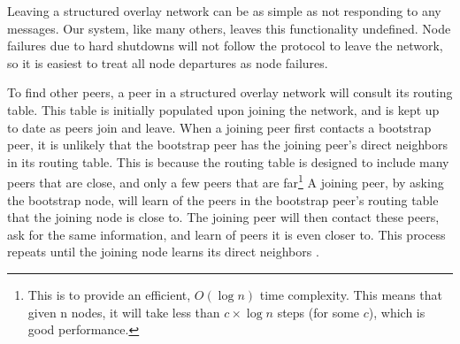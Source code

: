 \documentclass[12pt]{report}
\begin{document}

Leaving a structured overlay network can be as simple as not responding to any messages. Our system, like many others, leaves this functionality undefined. Node failures due to hard shutdowns will not follow the protocol to leave the network, so it is easiest to treat all node departures as node failures.

To find other peers, a peer in a structured overlay network will consult its routing table. This table is initially populated upon joining the network, and is kept up to date as peers join and leave. When a joining peer first contacts a bootstrap peer, it is unlikely that the bootstrap peer has the joining peer's direct neighbors in its routing table. This is because the routing table is designed to include many peers that are close, and only a few peers that are far\footnote{This is to provide an efficient, $O(\log n)$ time complexity. This means that given n nodes, it will take less than $c \times \log n$ steps (for some $c$), which is good performance.} A joining peer, by asking the bootstrap node, will learn of the peers in the bootstrap peer's routing table that the joining node is close to. The joining peer will then contact these peers, ask for the same information, and learn of peers it is even closer to. This process repeats until the joining node learns its direct neighbors \cite{p2pSurvey}.
\end{document}
